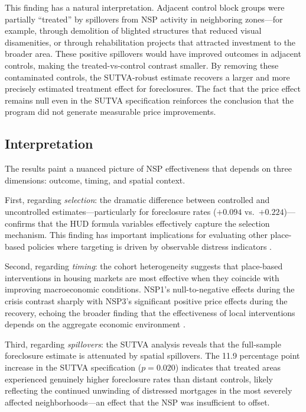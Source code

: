 \documentclass[12pt,authoryear]{elsarticle}
\begin{document}
This finding has a natural interpretation. Adjacent control block groups were partially ``treated'' by spillovers from NSP activity in neighboring zones---for example, through demolition of blighted structures that reduced visual disamenities, or through rehabilitation projects that attracted investment to the broader area. These positive spillovers would have improved outcomes in adjacent controls, making the treated-vs-control contrast smaller. By removing these contaminated controls, the SUTVA-robust estimate recovers a larger and more precisely estimated treatment effect for foreclosures. The fact that the price effect remains null even in the SUTVA specification reinforces the conclusion that the program did not generate measurable price improvements.

\subsection{Interpretation}

The results paint a nuanced picture of NSP effectiveness that depends on three dimensions: outcome, timing, and spatial context.

First, regarding \textit{selection}: the dramatic difference between controlled and uncontrolled estimates---particularly for foreclosure rates ($+0.094$ vs.\ $+0.224$)---confirms that the HUD formula variables effectively capture the selection mechanism. This finding has important implications for evaluating other place-based policies where targeting is driven by observable distress indicators \citep{ding2016}.

Second, regarding \textit{timing}: the cohort heterogeneity suggests that place-based interventions in housing markets are most effective when they coincide with improving macroeconomic conditions. NSP1's null-to-negative effects during the crisis contrast sharply with NSP3's significant positive price effects during the recovery, echoing the broader finding that the effectiveness of local interventions depends on the aggregate economic environment \citep{kline2013}.

Third, regarding \textit{spillovers}: the SUTVA analysis reveals that the full-sample foreclosure estimate is attenuated by spatial spillovers. The 11.9 percentage point increase in the SUTVA specification ($p = 0.020$) indicates that treated areas experienced genuinely higher foreclosure rates than distant controls, likely reflecting the continued unwinding of distressed mortgages in the most severely affected neighborhoods---an effect that the NSP was insufficient to offset.
\end{document}

